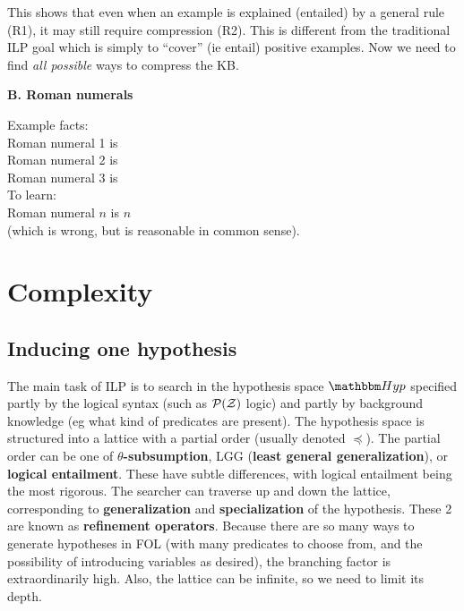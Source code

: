 This shows that even when an example is explained (entailed) by a general rule (R1), it may still require compression (R2).  This is different from the traditional ILP goal which is simply to ``cover'' (ie entail) positive examples.  Now we need to find \textit{all possible} ways to compress the KB.

\textbf{B. Roman numerals}

Example facts:\\
\hspace*{1cm} Roman numeral 1 is \\
\hspace*{1cm} Roman numeral 2 is \\
\hspace*{1cm} Roman numeral 3 is \\
To learn:\\
\hspace*{1cm} Roman numeral $n$ is $n$ \\
(which is wrong, but is reasonable in common sense).

\section{Complexity}

\subsection{Inducing one hypothesis}

The main task of ILP is to search in the hypothesis space $\Hyp$ specified partly by the logical syntax (such as $\mathcal{P(Z)}$ logic) and partly by background knowledge (eg what kind of predicates are present).  The hypothesis space is structured into a lattice with a partial order (usually denoted $ \preceq $).  The partial order can be one of \textbf{$\theta$-subsumption}, LGG (\textbf{least general generalization}), or \textbf{logical entailment}.  These have subtle differences, with logical entailment being the most rigorous.  The searcher can traverse up and down the lattice, corresponding to \textbf{generalization} and \textbf{specialization} of the hypothesis.  These 2 are known as \textbf{refinement operators}.  Because there are so many ways to generate hypotheses in FOL (with many predicates to choose from, and the possibility of introducing variables as desired), the branching factor is extraordinarily high.  Also, the lattice can be infinite, so we need to limit its depth.

